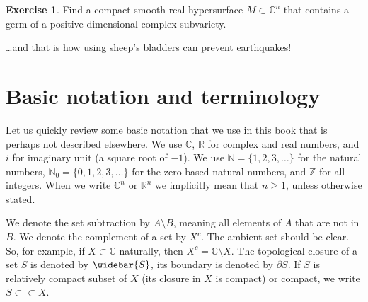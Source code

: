 \documentclass[12pt,openany]{book}
\newcommand{\C}{{\mathbb{C}}}
\newcommand{\R}{{\mathbb{R}}}
\newcommand{\Z}{{\mathbb{Z}}}
\newcommand{\N}{{\mathbb{N}}}
\theoremstyle{plain}
\theoremstyle{remark}
\theoremstyle{definition}
\newenvironment{exbox}{%
    \def\FrameCommand{\vrule width 1pt \relax\hspace{10pt}}%
    \MakeFramed {\advance \hsize -\width \FrameRestore}%
}{%
    \endMakeFramed
}
\theoremstyle{exercise}
\newtheorem{exercise}{Exercise}[section]
\theoremstyle{example}
\begin{document}
\begin{exbox}
\begin{exercise}
Find a compact smooth real hypersurface $M \subset \C^n$ that contains a germ
of a positive dimensional complex subvariety.
\end{exercise}
\end{exbox}

\vspace{1in}

\ldots and that is how using sheep's bladders can prevent
earthquakes!


\appendix



\chapter{Basic notation and terminology} \label{ap:basicnotation}



Let us quickly review some basic notation that we use in this
book that is perhaps not described elsewhere.
We use $\C$, $\R$ for complex and real numbers, and $i$ for imaginary unit
(a square root of $-1$).  We use
$\N = \{ 1,2,3, \ldots \}$ for 
the natural numbers, 
$\N_0 = \{ 0,1,2,3, \ldots \}$ for the zero-based natural numbers,
and $\Z$ for all integers.
When we write $\C^n$ or $\R^n$ we implicitly mean that $n \geq 1$, unless
otherwise stated.

%
We denote the set subtraction by $A \setminus B$, meaning all elements of
$A$ that are not in $B$.
We denote the complement of a set by $X^c$.  The ambient set
should be clear.  So, for example, if $X \subset \C$ naturally,
then $X^c = \C \setminus X$.
%
The topological closure of a set $S$ is denoted by $\widebar{S}$, its
boundary is denoted by
%
$\partial S$.  If $S$ is relatively compact subset of $X$
(its closure in $X$ is compact) or compact, we write $S \subset \subset X$.
\end{document}
